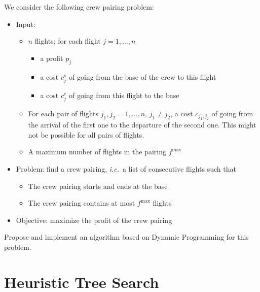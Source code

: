 \documentclass[a4paper,twocolumn]{article}
\begin{document}
We consider the following crew pairing problem:
\begin{itemize}
  \item Input:
    \begin{itemize}
      \item $n$ flights; for each flight $j = 1, \dots, n$
        \begin{itemize}
          \item a profit $p_j$
          \item a cost $c^s_j$ of going from the base of the crew to this flight
          \item a cost $c^e_j$ of going from this flight to the base
        \end{itemize}
      \item For each pair of flights $j_1, j_2 = 1, \dots, n$, $j_1 \neq j_2$, a cost $c_{j_1, j_2}$ of going from the arrival of the first one to the departure of the second one. This might not be possible for all pairs of flights.
      \item A maximum number of flights in the pairing $f^\text{max}$
    \end{itemize}
  \item Problem: find a crew pairing, \textit{i.e.}\ a list of consecutive flights such that
    \begin{itemize}
      \item The crew pairing starts and ends at the base
      \item The crew pairing contains at most $f^\text{max}$ flights
    \end{itemize}
  \item Objective: maximize the profit of the crew pairing
\end{itemize}

Propose and implement an algorithm based on Dynamic Programming for this problem.

\section{Heuristic Tree Search}
\end{document}
